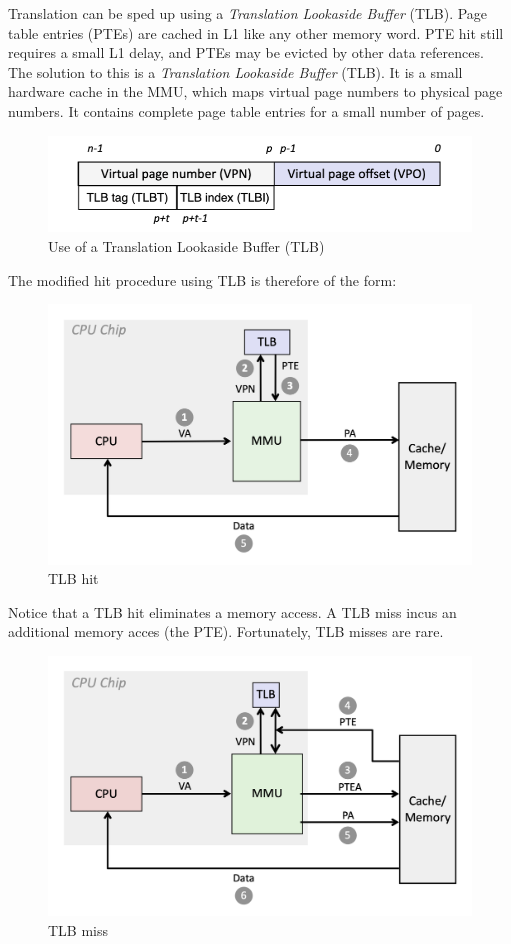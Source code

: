 \documentclass[toc]{../cs-classes/cs-classes}
\begin{document}
Translation can be sped up using a \emph{Translation Lookaside Buffer} (TLB). Page table entries (PTEs) are cached in L1 like any other memory word. PTE hit still requires a small L1 delay, and PTEs may be evicted by other data references. The solution to this is a \emph{Translation Lookaside Buffer} (TLB). It is a small hardware cache in the MMU, which maps virtual page numbers to physical page numbers. It contains complete page table entries for a small number of pages.
\begin{figure}[H]
    \centering
    \includegraphics[scale=0.8]{images/TLB.png}
    \caption{Use of a Translation Lookaside Buffer (TLB)}
\end{figure}
The modified hit procedure using TLB is therefore of the form:
\begin{figure}[H]
    \centering
    \includegraphics[scale=0.4]{images/TLB-hit.png}
    \caption{TLB hit}
\end{figure}
Notice that a TLB hit eliminates a memory access. A TLB miss incus an additional memory acces (the PTE). Fortunately, TLB misses are rare.
\begin{figure}[H]
    \centering
    \includegraphics[scale=0.4]{images/TLB-miss.png}
    \caption{TLB miss}
\end{figure}
\end{document}
